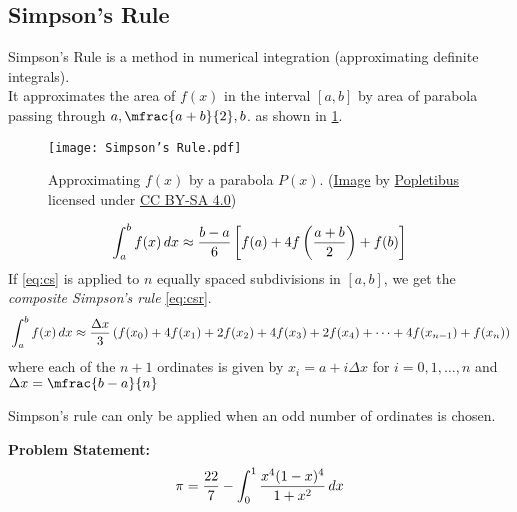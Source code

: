 \documentclass[../../Problems]{subfiles}
\begin{document}
\subsection{Simpson's Rule}{\label{pp:simpsonsrule}}
{\small%
Simpson's Rule is a method in numerical integration (approximating definite integrals).\\
It approximates the area of $f(x)$ in the interval $[a,b]$ by area of parabola passing through $a, \mfrac{a+b}{2}, b$. as shown in \ref{fig:simpsonsrule}.%
\begin{figure}[H]
\centering
\texttt{[image: Simpson's Rule.pdf]}
\caption{Approximating $f(x)$ by a parabola $P(x)$. (\href{https://bit.ly/simpsons-rule}{Image} by \href{https://commons.wikimedia.org/wiki/User:Popletibus}{Popletibus} licensed under \href{https://creativecommons.org/licenses/by-sa/4.0/}{CC BY-SA 4.0})}
\label{fig:simpsonsrule}
\end{figure}
\begin{equation}{\label{eq:cs}}
{ \int _{a}^{b}f(x)\,dx\approx {\frac {b-a}{6}}\left[f(a)+4f\left({\frac {a+b}{2}}\right)+f(b)\right]}
\end{equation}
If \ref{eq:cs} is applied to $n$ equally spaced subdivisions in $[a, b]$, we get the \emph{composite Simpson's rule} \ref{eq:csr}.
\begin{equation}{\label{eq:csr}}
	 \int _{a}^{b}f(x)\,dx\approx {\frac {\Delta x}{3}}\left(f(x_{0})+4f(x_{1})+2f(x_{2})+4f(x_{3})+2f(x_{4})+\cdots +4f(x_{n-1})+f(x_{n})\right)
\end{equation}
where each of the $n+1$ ordinates is given by $x_i = a+i\Delta x$ for $i = 0,1,\ldots,n$ and $\Delta x = \mfrac{b-a}{n}$
\begin{note}
	Simpson's rule can only be applied when an odd number of ordinates is chosen.
\end{note}
\textbf{Problem Statement:}\\
\begin{equation}{\label{eq:pi_integral}}
{ \pi={22 \over 7} - \int _{0}^{1}{x^{4}(1-x)^{4} \over 1+x^{2}}\,dx } 
\end{equation}
}
\end{document}
